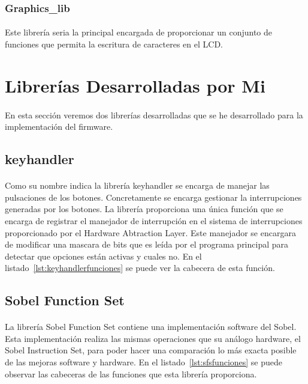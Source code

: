 \documentclass[a4paper,12pt,titlepage,final]{book}
\begin{document}
\subsubsection{Graphics\_lib}
\paragraph{}
Este librería seria la principal encargada de proporcionar un conjunto de funciones que permita la escritura de caracteres en el LCD.

\section{Librerías Desarrolladas por Mi}
\paragraph{}
En esta sección veremos dos librerías desarrolladas que se he desarrollado para la implementación del firmware.

\subsection{keyhandler}
\paragraph{}
Como su nombre indica la librería keyhandler se encarga de manejar las pulsaciones de los botones. Concretamente se encarga gestionar la interrupciones generadas por los botones. La librería proporciona una única función que se encarga de registrar el manejador de interrupción en el sistema de interrupciones proporcionado por el Hardware Abtraction Layer. Este manejador se encargara de modificar una mascara de bits que es leída por el programa principal para detectar que opciones están activas y cuales no. En el listado~\ref{lst:keyhandlerfunciones} se puede ver la cabecera de esta función.



\subsection{Sobel Function Set}
\paragraph{}
La librería Sobel Function Set contiene una implementación software del Sobel. Esta implementación realiza las mismas operaciones que su análogo hardware, el Sobel Instruction Set, para poder hacer una comparación lo más exacta posible de las mejoras software y hardware. En el listado~\ref{lst:sfsfunciones} se puede observar las cabeceras de las funciones que esta librería proporciona.
\end{document}
